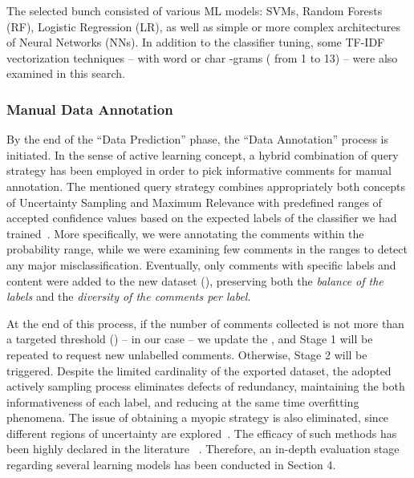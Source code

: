 \documentclass{article}
\begin{document}
The selected bunch consisted of various ML models: SVMs, Random Forests (RF), Logistic Regression (LR), as well as simple or more complex architectures of Neural Networks (NNs). In addition to the classifier tuning, some TF-IDF vectorization techniques -- with word or char -grams ( from 1 to 13) -- were also examined in this search.

\subsubsection{Manual Data Annotation} 
By the end of the ``Data Prediction'' phase, the ``Data Annotation'' process is initiated. In the sense of active learning concept, a hybrid combination of query strategy has been employed in order to pick informative comments for manual annotation. The mentioned query strategy combines appropriately both concepts of Uncertainty Sampling and Maximum Relevance with predefined ranges of accepted confidence values based on the expected labels of the classifier we had trained~\cite{DBLP:journals/kbs/PupoAV18}. More specifically, we were annotating the comments within the  probability range, while we were examining few comments in the ranges  to detect any major misclassification. Eventually, only comments with specific labels and content were added to the new dataset (), preserving both the \textit{balance of the labels} and the \textit{diversity of the comments per label}. 

At the end of this process, if the number of comments collected is not more than a targeted threshold () -- in our case  -- we update the , and Stage 1 will be repeated to request new unlabelled comments. Otherwise, Stage 2 will be triggered. Despite the limited cardinality of the exported dataset, the adopted actively sampling process eliminates defects of redundancy, maintaining the both informativeness of each label, and reducing at the same time overfitting phenomena. The issue of obtaining a myopic strategy is also eliminated, since different regions of uncertainty are explored~\cite{DBLP:journals/ml/KremplKL15}. The efficacy of such methods has been highly declared in the literature ~\cite{DBLP:journals/puc/MalikS17,DBLP:journals/jcst/KumarG20}. Therefore, an in-depth evaluation stage regarding several learning models has been conducted in Section 4.
\end{document}
